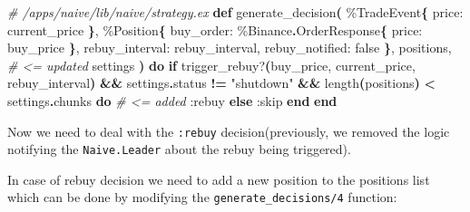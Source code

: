 \documentclass[
  oneside]{book}
\newenvironment{Shaded}{\begin{snugshade}}{\end{snugshade}}
\newcommand{\CommentTok}[1]{\textcolor[rgb]{0.56,0.35,0.01}{\textit{#1}}}
\newcommand{\ConstantTok}[1]{\textcolor[rgb]{0.56,0.35,0.01}{#1}}
\newcommand{\ControlFlowTok}[1]{\textcolor[rgb]{0.13,0.29,0.53}{\textbf{#1}}}
\newcommand{\FunctionTok}[1]{\textcolor[rgb]{0.13,0.29,0.53}{\textbf{#1}}}
\newcommand{\KeywordTok}[1]{\textcolor[rgb]{0.13,0.29,0.53}{\textbf{#1}}}
\newcommand{\NormalTok}[1]{#1}
\newcommand{\OperatorTok}[1]{\textcolor[rgb]{0.81,0.36,0.00}{\textbf{#1}}}
\newcommand{\StringTok}[1]{\textcolor[rgb]{0.31,0.60,0.02}{#1}}
\newcommand{\VariableTok}[1]{\textcolor[rgb]{0.00,0.00,0.00}{#1}}
\begin{document}
\begin{Shaded}
\begin{Highlighting}[]
  \CommentTok{\# /apps/naive/lib/naive/strategy.ex}
  \KeywordTok{def}\NormalTok{ generate\_decision}\FunctionTok{(}
\NormalTok{        \%}\ConstantTok{TradeEvent}\FunctionTok{\{}
          \VariableTok{price:}\NormalTok{ current\_price}
        \FunctionTok{\}}\NormalTok{,}
\NormalTok{        \%}\ConstantTok{Position}\FunctionTok{\{}
          \VariableTok{buy\_order:}\NormalTok{ \%}\ConstantTok{Binance}\OperatorTok{.}\ConstantTok{OrderResponse}\FunctionTok{\{}
            \VariableTok{price:}\NormalTok{ buy\_price}
          \FunctionTok{\}}\NormalTok{,}
          \VariableTok{rebuy\_interval:}\NormalTok{ rebuy\_interval,}
          \VariableTok{rebuy\_notified:} \ConstantTok{false}
        \FunctionTok{\}}\NormalTok{,}
\NormalTok{        positions, }\CommentTok{\# \textless{}= updated}
\NormalTok{        settings}
      \FunctionTok{)} \KeywordTok{do}
    \ControlFlowTok{if}\NormalTok{ trigger\_rebuy?}\FunctionTok{(}\NormalTok{buy\_price, current\_price, rebuy\_interval}\FunctionTok{)} \OperatorTok{\&\&}
\NormalTok{         settings}\OperatorTok{.}\NormalTok{status}\OperatorTok{ !=} \StringTok{"shutdown"} \OperatorTok{\&\&}
\NormalTok{         length}\FunctionTok{(}\NormalTok{positions}\FunctionTok{)} \OperatorTok{\textless{}}\NormalTok{ settings}\OperatorTok{.}\NormalTok{chunks }\KeywordTok{do} \CommentTok{\# \textless{}= added}
      \VariableTok{:rebuy}
    \ControlFlowTok{else}
      \VariableTok{:skip}
    \KeywordTok{end}
  \KeywordTok{end}
\end{Highlighting}
\end{Shaded}

Now we need to deal with the \texttt{:rebuy} decision(previously, we removed the logic notifying the \texttt{Naive.Leader} about the rebuy being triggered).

\newpage

In case of rebuy decision we need to add a new position to the positions list which can be done by modifying the \texttt{generate\_decisions/4} function:
\end{document}
